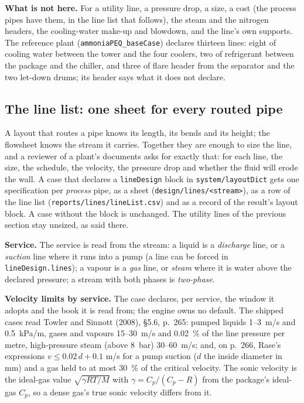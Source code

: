\documentclass[11pt,a4paper]{article}
\begin{document}
\textbf{What is not here.} For a utility line, a pressure drop, a size, a
cost (the process pipes have them, in the line list that follows), the steam and
the nitrogen headers, the cooling-water make-up and blowdown, and the
line's own supports. The reference plant
(\texttt{ammoniaPEQ\_baseCase}) declares thirteen lines: eight of
cooling water between the tower and the four coolers, two of refrigerant
between the package and the chiller, and three of flare header from the
separator and the two let-down drums; its header says what it does not
declare.

\hypertarget{line-list}{%
\subsection{The line list: one sheet for every routed
pipe}\label{line-list}}\label{sec:line-list}

A layout that routes a pipe knows its length, its bends and its height;
the flowsheet knows the stream it carries. Together they are enough to
size the line, and a reviewer of a plant's documents asks for exactly
that: for each line, the size, the schedule, the velocity, the pressure
drop and whether the fluid will erode the wall. A case that declares a
\texttt{lineDesign} block in \texttt{system/layoutDict} gets one
specification per \emph{process} pipe, as a sheet
(\texttt{design/lines/<stream>}), as a row of the line list
(\texttt{reports/lines/lineList.csv}) and as a record of the result's
layout block. A case without the block is unchanged. The utility lines
of the previous section stay unsized, as said there.

\textbf{Service.} The service is read from the stream: a liquid is a
\emph{discharge} line, or a \emph{suction} line where it runs into a pump
(a line can be forced in \texttt{lineDesign.lines}); a vapour is a
\emph{gas} line, or \emph{steam} where it is water above the declared
pressure; a stream with both phases is \emph{two-phase}.

\textbf{Velocity limits by service.} The case declares, per service, the
window it adopts and the book it is read from; the engine owns no default.
The shipped cases read Towler and Sinnott (2008), \S5.6, p.~265: pumped
liquids 1--3~m/s and 0.5~kPa/m, gases and vapours 15--30~m/s and 0.02~\%
of the line pressure per metre, high-pressure steam (above 8~bar)
30--60~m/s; and, on p.~266, Rase's expressions $v \le 0.02\,d + 0.1$
m/s for a pump suction ($d$ the inside diameter in mm) and a gas held to
at most 30~\% of the critical velocity. The sonic velocity is the
ideal-gas value $\sqrt{\gamma R T / M}$ with $\gamma = C_p/(C_p - R)$
from the package's ideal-gas $C_p$, so a dense gas's true sonic velocity
differs from it.
\end{document}
